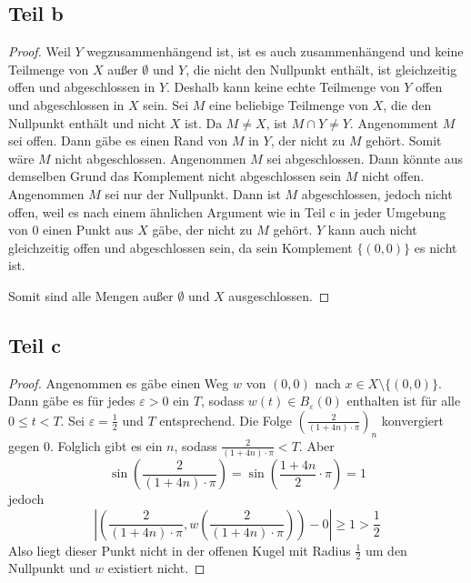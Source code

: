 \documentclass[10pt,a4paper]{article}
\begin{document}
\subsection{Teil b}
\begin{proof}
  Weil $Y$ wegzusammenhängend ist, ist es auch zusammenhängend und keine Teilmenge von $X$ außer $\emptyset$ und $Y$, die nicht den Nullpunkt enthält, ist gleichzeitig offen und abgeschlossen in $Y$.
  Deshalb kann keine echte Teilmenge von $Y$ offen und abgeschlossen in $X$ sein.
  Sei $M$ eine beliebige Teilmenge von $X$, die den Nullpunkt enthält und nicht $X$ ist.
  Da $M \ne X$, ist $M \cap Y \ne Y$.
  Angenomment $M$ sei offen.
  Dann gäbe es einen Rand von $M$ in $Y$, der nicht zu $M$ gehört.
  Somit wäre $M$ nicht abgeschlossen.
  Angenommen $M$ sei abgeschlossen.
  Dann könnte aus demselben Grund das Komplement nicht abgeschlossen sein $M$ nicht offen.
  Angenommen $M$ sei nur der Nullpunkt.
  Dann ist $M$ abgeschlossen, jedoch nicht offen, weil es nach einem ähnlichen Argument wie in Teil c in jeder Umgebung von $0$ einen Punkt aus $X$ gäbe, der nicht zu $M$ gehört.
  $Y$ kann auch nicht gleichzeitig offen und abgeschlossen sein, da sein Komplement $\{ (0, 0) \}$ es nicht ist.

  Somit sind alle Mengen außer $\emptyset$ und $X$ ausgeschlossen.
\end{proof}

\subsection{Teil c}
\begin{proof}
  Angenommen es gäbe einen Weg $w$ von $(0, 0)$ nach $x \in X \setminus \{ (0, 0) \}$.
  Dann gäbe es für jedes $\varepsilon > 0$ ein $T$, sodass $w(t) \in B_{\varepsilon}(0)$ enthalten ist für alle $0 \le t < T$.
  Sei $\varepsilon = \frac{1}{2}$ und $T$ entsprechend.
  Die Folge $\left( \frac{2}{(1 + 4n) \cdot \pi} \right)_{n}$ konvergiert gegen 0.
  Folglich gibt es ein $n$, sodass $\frac{2}{(1 + 4n) \cdot \pi} < T$.
  Aber
  \begin{equation}
    \sin\left( \frac{2}{(1 + 4n) \cdot \pi} \right) = \sin\left( \frac{1 + 4n}{2} \cdot \pi \right) = 1
  \end{equation}
  jedoch
  \begin{equation}
    |(\frac{2}{(1 + 4n) \cdot \pi}, w(\frac{2}{(1 + 4n) \cdot \pi})) - 0| \ge 1 > \frac{1}{2}
  \end{equation}
  Also liegt dieser Punkt nicht in der offenen Kugel mit Radius $\frac{1}{2}$ um den Nullpunkt und $w$ existiert nicht.
\end{proof}
\end{document}
